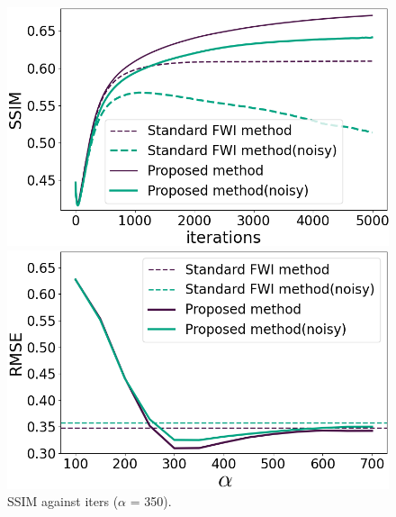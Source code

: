 \begin{figure}[htbp]
    \centering
    \hspace{-3mm}
    \begin{minipage}{58mm}
        \centering
        \includegraphics[width=\linewidth]{public/iters-ssim-all-colored}
        \caption{SSIM against iters ($\alpha$ = 350).}
        \label{fig:iters-ssim-noisy}
    \end{minipage}
    \hspace{-1mm}
    \begin{minipage}{58mm}
        \centering
        \includegraphics[width=\linewidth]{public/alpha-rmse-colored}

\end{minipage}
\end{figure}

